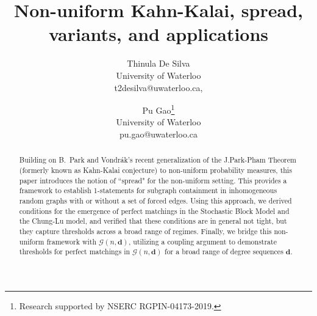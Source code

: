 \documentclass[12pt]{article}
\begin{document}
\predate{}
\postdate{}

\author{Thinula De Silva\\ University of Waterloo\\ t2desilva@uwaterloo.ca,\and Pu Gao\thanks{Research supported by NSERC RGPIN-04173-2019.}\\ University of Waterloo\\ pu.gao@uwaterloo.ca}
\title{Non-uniform Kahn-Kalai, spread, variants, and applications}
\date{} %

\maketitle


\def\G{{\mathcal G}}
\def\F{{\mathcal F}}
\def\P{{\mathcal P}}
\def\bfU{{\bf U}}



\renewcommand{\vec}[1]{\textbf{#1}}
\newcommand{\prob}[1]{\mathbb{P}\left(#1\right)}
\newcommand{\expect}[1]{\mathbb{E}\left(#1\right)}
\newcommand{\var}[1]{\operatorname{Var}\left(#1\right)}
\newcommand{\C}{\mathbb{C}}
\newcommand{\R}{\mathbb{R}}
\newcommand{\N}{\mathbb{N}}
\newcommand{\Z}{\mathbb{Z}}
\newcommand{\gen}[1]{\left\langle #1 \right\rangle}
\renewcommand{\vocab}[1]{{\it #1}}
\newcommand{\notetoself}[1]{\textbf{\color{blue} #1}}

\newcommand{\jc}[1]{{\color{red}[Jane: #1]}}
\newcommand{\tc}[1]{{\color{olive}[Thinula: #1]}}
\newcommand{\tr}[1]{\color{violet} #1}
\newcommand{\remove}[1]{{}}

\newcommand\pdfmath[1]{\texorpdfstring{$#1$}{}}

\newcommand{\nvec}{\vec{n}}

\begin{abstract}
Building on B.~Park and Vondr{\'a}k's recent generalization of the J.Park-Pham Theorem (formerly known as Kahn-Kalai conjecture) to non-uniform probability measures, this paper introduces the notion of ``spread" for the non-uniform setting. This provides a framework to establish 1-statements for subgraph containment in inhomogeneous random graphs with or without a set of forced edges. Using this approach, we derived conditions for the emergence of perfect matchings in the Stochastic Block Model and the Chung-Lu model, and verified that these conditions are in general not tight, but they capture thresholds across a broad range of regimes. Finally, we bridge this non-uniform framework with $\mathcal{G}(n,\vec{d})$, utilizing a coupling argument to demonstrate thresholds for perfect matchings in $\mathcal{G}(n,\vec{d})$ for a broad range of degree sequences $\vec{d}$. 
\end{abstract}
\end{document}
